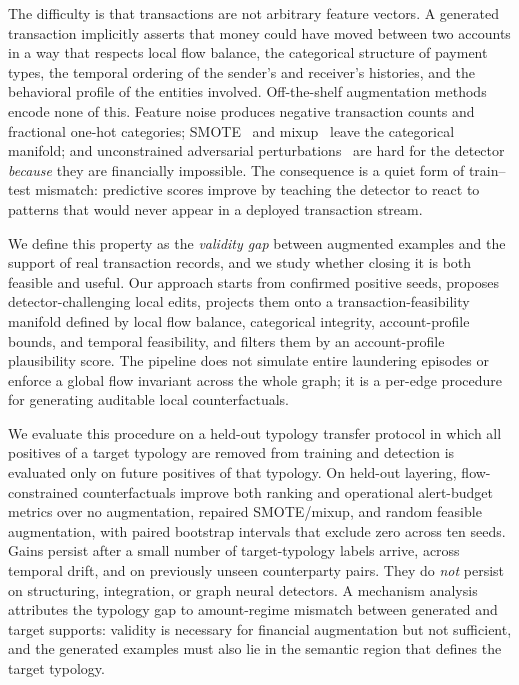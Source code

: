 \documentclass[sigconf,review,anonymous]{acmart}
\begin{document}
The difficulty is that transactions are not arbitrary feature vectors. A
generated transaction implicitly asserts that money could have moved between
two accounts in a way that respects local flow balance, the categorical
structure of payment types, the temporal ordering of the sender's and
receiver's histories, and the behavioral profile of the entities involved.
Off-the-shelf augmentation methods encode none of this. Feature noise produces
negative transaction counts and fractional one-hot categories;
SMOTE~\cite{chawla2002smote} and mixup~\cite{zhang2018mixup} leave the
categorical manifold; and unconstrained adversarial
perturbations~\cite{goodfellow2015explaining,madry2018towards} are hard for the
detector \emph{because} they are financially impossible. The consequence is a
quiet form of train--test mismatch: predictive scores improve by teaching the
detector to react to patterns that would never appear in a deployed
transaction stream.

We define this property as the \emph{validity gap} between augmented examples
and the support of real transaction records, and we study whether closing it
is both feasible and useful. Our approach starts from confirmed positive
seeds, proposes detector-challenging local edits, projects them onto a
transaction-feasibility manifold defined by local flow balance, categorical
integrity, account-profile bounds, and temporal feasibility, and filters them
by an account-profile plausibility score. The pipeline does not simulate
entire laundering episodes or enforce a global flow invariant across the
whole graph; it is a per-edge procedure for generating auditable local
counterfactuals.

We evaluate this procedure on a held-out typology transfer protocol in which
all positives of a target typology are removed from training and detection
is evaluated only on future positives of that typology. On held-out layering,
flow-constrained counterfactuals improve both ranking and operational
alert-budget metrics over no augmentation, repaired SMOTE/mixup, and random
feasible augmentation, with paired bootstrap intervals that exclude zero across
ten seeds. Gains persist after a small number of target-typology labels
arrive, across temporal drift, and on previously unseen counterparty pairs.
They do \emph{not} persist on structuring, integration, or graph neural
detectors. A mechanism analysis attributes the typology gap to amount-regime
mismatch between generated and target supports: validity is necessary for
financial augmentation but not sufficient, and the generated examples must
also lie in the semantic region that defines the target typology.
\end{document}
